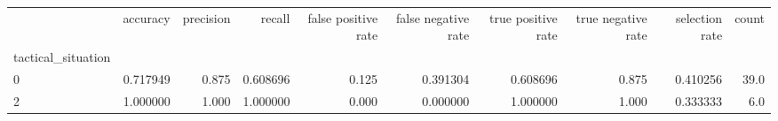\begin{tabular}{lrrrrrrrrr}
\toprule
{} &  accuracy &  precision &    recall &  false positive rate &  false negative rate &  true positive rate &  true negative rate &  selection rate &  count \\
tactical\_situation &           &            &           &                      &                      &                     &                     &                 &        \\
\midrule
0                  &  0.717949 &      0.875 &  0.608696 &                0.125 &             0.391304 &            0.608696 &               0.875 &        0.410256 &   39.0 \\
2                  &  1.000000 &      1.000 &  1.000000 &                0.000 &             0.000000 &            1.000000 &               1.000 &        0.333333 &    6.0 \\
\bottomrule
\end{tabular}
